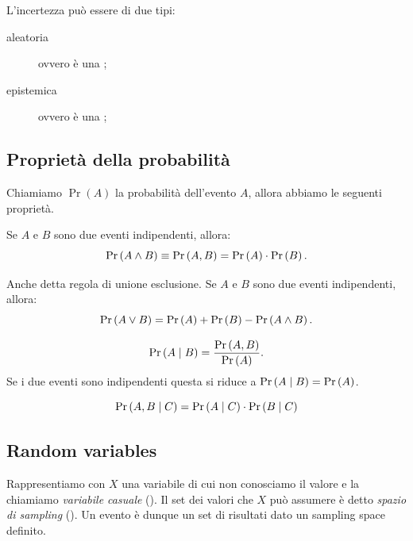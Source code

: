 \documentclass[10pt]{article}
\DeclareMathOperator{\pr}{Pr}
\newcommand{\pare}[1]{
	\ensuremath{\left(#1\right)}
}
\begin{document}
L'incertezza può essere di due tipi:
\begin{description}
\item[aleatoria] ovvero è una ;
\item[epistemica] ovvero è una ;
\end{description}

\subsection{Proprietà della probabilità}
Chiamiamo $\pr(A)$ la probabilità dell'evento $A$, allora abbiamo le seguenti proprietà.

\begin{property}
Se $A$ e $B$ sono due eventi indipendenti, allora:
\begin{equation}
\pr\pare{A\et B} \equiv \pr\pare{A, B} = \pr\pare{A} \cdot \pr\pare{B}.
\end{equation}
\end{property}

\begin{property}
Anche detta regola di unione esclusione. Se $A$ e $B$ sono due eventi indipendenti, allora:
\begin{equation}
\pr\pare{A\orr B} = \pr\pare{A} + \pr\pare{B} - \pr\pare{A\et B}.
\end{equation}
\end{property}

\begin{property}
\begin{equation}
\pr\pare{A\cond B} = \frac{\pr\pare{A, B}}{\pr\pare{A}}.
\end{equation}
Se i due eventi sono indipendenti questa si riduce a $\pr\pare{A\cond B} = \pr\pare{A}$.
\end{property}

\begin{property}
\begin{equation}
\pr\pare{A, B \cond C} = \pr\pare{A\cond C} \cdot \pr\pare{B\cond C}
\end{equation}
\end{property}

\subsection{Random variables}
Rappresentiamo con $X$ una variabile di cui non conosciamo il valore e la
chiamiamo \textit{variabile casuale} (). Il set dei valori
che $X$ può assumere è detto \textit{spazio di sampling} ().
Un evento è dunque un set di risultati dato un sampling space definito.
\end{document}
